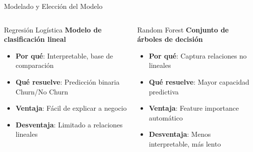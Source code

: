 
\begin{frame}{Modelado y Elección del Modelo}
    \begin{columns}[t]
        \begin{block}{Regresión Logística}
            \centering
            \textbf{Modelo de clasificación lineal}
            \begin{itemize}
                \item \textbf{Por qué}: Interpretable, base de comparación
                \item \textbf{Qué resuelve}: Predicción binaria Churn/No Churn
                \item \textbf{Ventaja}: Fácil de explicar a negocio
                \item \textbf{Desventaja}: Limitado a relaciones lineales
            \end{itemize}
        \end{block}
        
        \begin{block}{Random Forest}
            \centering
            \textbf{Conjunto de árboles de decisión}
            \begin{itemize}
                \item \textbf{Por qué}: Captura relaciones no lineales
                \item \textbf{Qué resuelve}: Mayor capacidad predictiva
                \item \textbf{Ventaja}: Feature importance automático
                \item \textbf{Desventaja}: Menos interpretable, más lento
            \end{itemize}
        \end{block}
    \end{columns}
    

\end{frame}
